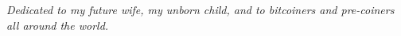 
\newpage \vspace*{8cm}
\thispagestyle{empty}
\begin{center}
  \Large \emph{
  Dedicated to my future wife, my unborn child, and to bitcoiners and pre-coiners all around the world.
  }
\end{center}
